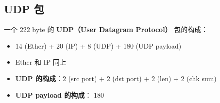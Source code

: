 
\subsection{UDP 包}
一个 222 byte 的 \textbf{UDP（User Datagram Protocol）} 包的构成：
\begin{itemize}
\item 14 (Ether) + 20 (IP) + 8 (UDP) + 180 (UDP payload)
\item Ether 和 IP 同上
\item \textbf{UDP 的构成}：2 (src port) + 2 (dst port) + 2 (len) + 2 (chk sum)
\item \textbf{UDP payload 的构成}： 180
\end{itemize}
